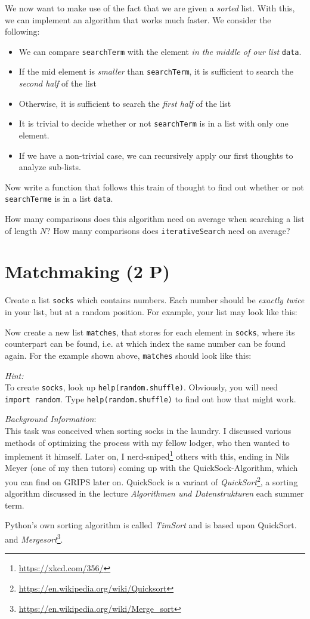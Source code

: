 \documentclass[
	ngerman,
	fontsize=10pt,
	parskip=half,
	titlepage=true,
	DIV=12
]{scrartcl}
\newcommand*{\inPy}[1]{\texttt{#1}}
\newcommand*{\ie}{i.\;e. }
\begin{document}
We now want to make use of the fact that we are given a \emph{sorted} list. With this, we can implement an algorithm that works much faster. We consider the following:
\begin{itemize}
\item We can compare \texttt{searchTerm} with the element \emph{in the middle of our list} \texttt{data}.
\item If the mid element is \emph{smaller} than \texttt{searchTerm}, it is sufficient to search the \emph{second half} of the list
\item Otherwise, it is sufficient to search the \emph{first half} of the list
\item It is trivial to decide whether or not \texttt{searchTerm} is in a list with only one element.
\item If we have a non-trivial case, we can recursively apply our first thoughts to analyze sub-lists.
\end{itemize}

Now write a function that follows this train of thought to find out whether or not \texttt{searchTerme} is in a list \texttt{data}.

How many comparisons does this algorithm need on average when searching a list of length $N$? How many comparisons does \texttt{iterativeSearch} need on average?


\section{Matchmaking (2 P)}
Create a list \texttt{socks} which contains numbers. Each number should be \emph{exactly twice} in your list, but at a random position. For example, your list may look like this:

Now create a new list \texttt{matches}, that stores for each element in \texttt{socks}, where its counterpart can be found, \ie at which index the same number can be found again. For the example shown above, \texttt{matches} should look like this:

\emph{Hint:}\\
To create \texttt{socks}, look up \texttt{help(random.shuffle)}. Obviously, you will need \inPy{import random}. Type \inPy{help(random.shuffle)} to find out how that might work.

\emph{Background Information}:\\
This task was conceived when sorting socks in the laundry. I discussed various methods of optimizing the process with my fellow lodger, who then wanted to implement it himself. Later on, I nerd-sniped\footnote{\url{https://xkcd.com/356/}} others with this, ending in Nils Meyer (one of my then tutors) coming up with the QuickSock-Algorithm, which you can find on GRIPS later on. QuickSock is a variant of \emph{QuickSort}\footnote{\url{https://en.wikipedia.org/wiki/Quicksort}}, a sorting algorithm discussed in the lecture \emph{Algorithmen und Datenstrukturen} each summer term.

Python's own sorting algorithm is called \emph{TimSort} and is based upon QuickSort. and \emph{Mergesort}\footnote{\url{https://en.wikipedia.org/wiki/Merge_sort}}.
\end{document}
